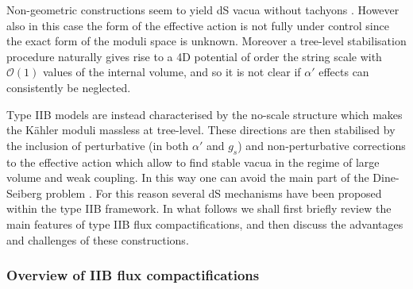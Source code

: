 \documentclass[11pt,a4paper]{article}
\newcommand{\mc}{\mathcal}
\begin{document}
Non-geometric constructions seem to yield dS vacua without tachyons \cite{deCarlos:2009fq, Danielsson:2012by, Blaback:2013ht, Damian:2013dq, Damian:2013dwa}. However also in this case the form of the effective action is not fully under control since the exact form of the moduli space is unknown. Moreover a tree-level stabilisation procedure naturally gives rise to a 4D potential of order the string scale with $\mc{O}(1)$ values of the internal volume, and so it is not clear if $\alpha'$ effects can consistently be neglected.  

Type IIB models are instead characterised by the no-scale structure which makes the K\"ahler moduli massless at tree-level. These directions are then stabilised by the inclusion of perturbative (in both $\alpha'$ and $g_s$) and non-perturbative corrections to the effective action which allow to find stable vacua in the regime of large volume and weak coupling. In this way one can avoid the main part of the Dine-Seiberg problem \cite{Dine:1985he}. For this reason several dS mechanisms have been proposed within the type IIB framework. In what follows we shall first briefly review the main features of type IIB flux compactifications, and then discuss the advantages and challenges of these constructions.


\subsubsection{Overview of IIB flux compactifications}
\end{document}
